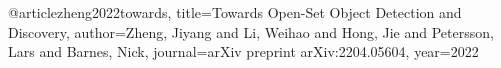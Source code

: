 @article{zheng2022towards,
  title={Towards Open-Set Object Detection and Discovery},
  author={Zheng, Jiyang and Li, Weihao and Hong, Jie and Petersson, Lars and Barnes, Nick},
  journal={arXiv preprint arXiv:2204.05604},
  year={2022}
}
